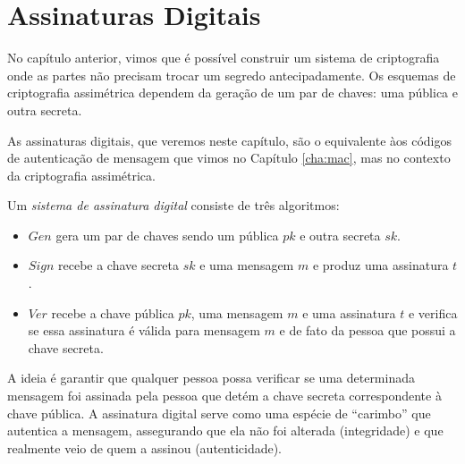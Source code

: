 \chapter{Assinaturas Digitais}
\label{cha:assinaturas-digitais}

No capítulo anterior, vimos que é possível construir um sistema de criptografia onde as partes não precisam trocar um segredo antecipadamente.
Os esquemas de criptografia assimétrica dependem da geração de um par de chaves: uma pública e outra secreta.

As assinaturas digitais, que veremos neste capítulo, são o equivalente àos códigos de autenticação de mensagem que vimos no Capítulo \ref{cha:mac}, mas no contexto da criptografia assimétrica.

\begin{center}
\end{center}

Um {\em sistema de assinatura digital} consiste de três algoritmos:
\begin{itemize}
\item[] $Gen$ gera um par de chaves sendo um pública $pk$ e outra secreta $sk$.
\item[] $Sign$ recebe a chave secreta $sk$ e uma mensagem $m$ e produz uma assinatura $t$.
\item[] $Ver$ recebe a chave pública $pk$, uma mensagem $m$ e uma assinatura $t$ e verifica se essa assinatura é válida para mensagem $m$ e de fato da pessoa que possui a chave secreta.
\end{itemize}

A ideia é garantir que qualquer pessoa possa verificar se uma determinada mensagem foi assinada pela pessoa que detém a chave secreta correspondente à chave pública.
A assinatura digital serve como uma espécie de ``carimbo'' que autentica a mensagem, assegurando que ela não foi alterada (integridade) e que realmente veio de quem a assinou (autenticidade).


